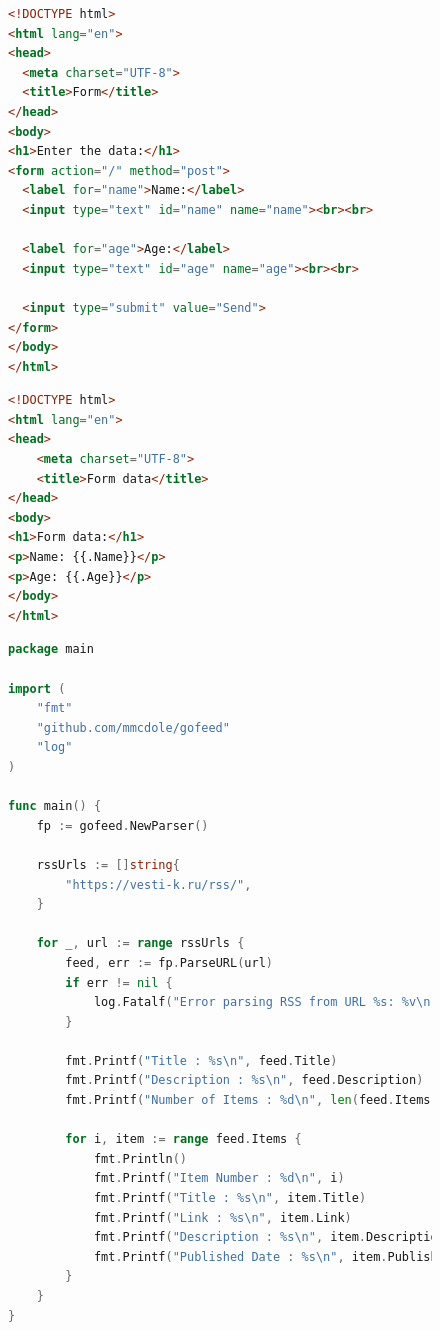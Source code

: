 \documentclass[a4paper, 14pt]{extarticle}
\begin{document}
\newpage
\begin{figure}[!htb]
\begin{lstlisting}[language={HTML},caption={form.html},label={lst:code3}]
<!DOCTYPE html>
<html lang="en">
<head>
  <meta charset="UTF-8">
  <title>Form</title>
</head>
<body>
<h1>Enter the data:</h1>
<form action="/" method="post">
  <label for="name">Name:</label>
  <input type="text" id="name" name="name"><br><br>

  <label for="age">Age:</label>
  <input type="text" id="age" name="age"><br><br>

  <input type="submit" value="Send">
</form>
</body>
</html>
\end{lstlisting}
\end{figure}
\newpage
\begin{figure}[!htb]
\begin{lstlisting}[language={HTML},caption={data.html},label={lst:code4}]
<!DOCTYPE html>
<html lang="en">
<head>
    <meta charset="UTF-8">
    <title>Form data</title>
</head>
<body>
<h1>Form data:</h1>
<p>Name: {{.Name}}</p>
<p>Age: {{.Age}}</p>
</body>
</html>

\end{lstlisting}
\end{figure}
\newpage
\begin{figure}[!htb]
\begin{lstlisting}[language={Go},caption={o.2.go},label={lst:code5}]
package main

import (
	"fmt"
	"github.com/mmcdole/gofeed"
	"log"
)

func main() {
	fp := gofeed.NewParser()

	rssUrls := []string{
		"https://vesti-k.ru/rss/",
	}

	for _, url := range rssUrls {
		feed, err := fp.ParseURL(url)
		if err != nil {
			log.Fatalf("Error parsing RSS from URL %s: %v\n", url, err)
		}

		fmt.Printf("Title : %s\n", feed.Title)
		fmt.Printf("Description : %s\n", feed.Description)
		fmt.Printf("Number of Items : %d\n", len(feed.Items))

		for i, item := range feed.Items {
			fmt.Println()
			fmt.Printf("Item Number : %d\n", i)
			fmt.Printf("Title : %s\n", item.Title)
			fmt.Printf("Link : %s\n", item.Link)
			fmt.Printf("Description : %s\n", item.Description)
			fmt.Printf("Published Date : %s\n", item.Published)
		}
	}
}
\end{lstlisting}
\end{figure}
\end{document}
